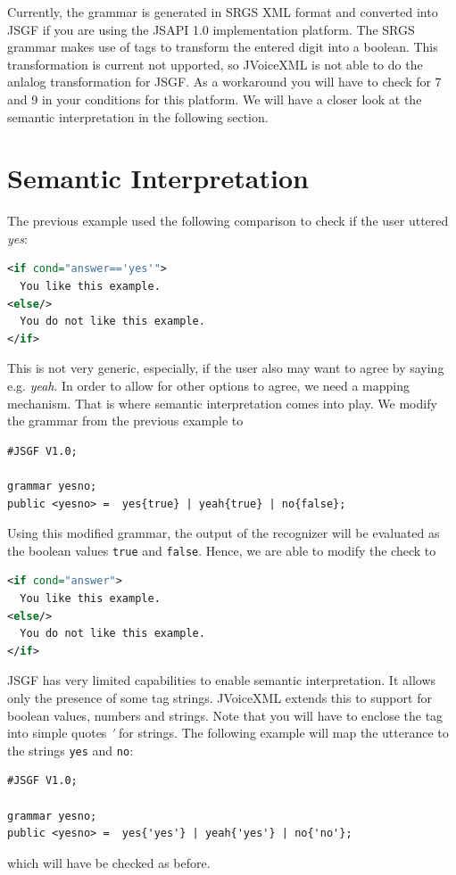 \documentclass[11pt,a4paper]{book}
\begin{document}
Currently, the grammar is generated in SRGS XML format and converted into JSGF
if you are using the JSAPI 1.0 implementation platform. The SRGS grammar
makes use of tags to transform the entered digit into a boolean. This
transformation is current not upported, so JVoiceXML is not able to do the
anlalog transformation for JSGF. As a workaround you will have to check for 7
and 9 in your conditions for this platform. We will have a closer look at the
semantic interpretation in the following section.

\section{Semantic Interpretation}
\label{sec:semantic-interpretation}

The previous example used the following comparison to check if the user uttered
\emph{yes}:

\begin{lstlisting}[language=XML]
<if cond="answer=='yes'">
  You like this example.
<else/>
  You do not like this example.
</if>
\end{lstlisting}

This is not very generic, especially, if the user also may want to agree by
saying e.g. \emph{yeah}. In order to allow for other options to agree, we need
a mapping mechanism. That is where semantic interpretation comes into play. We
modify the grammar from the previous example to

\begin{lstlisting}
#JSGF V1.0;

grammar yesno;
public <yesno> =  yes{true} | yeah{true} | no{false};
\end{lstlisting}

Using this modified grammar, the output of the recognizer will be evaluated
as the boolean values \lstinline{true} and \lstinline{false}. Hence, we are
able to modify the check to

\begin{lstlisting}[language=XML]
<if cond="answer">
  You like this example.
<else/>
  You do not like this example.
</if>
\end{lstlisting}

JSGF has very limited capabilities to enable semantic interpretation.
It allows only the presence of some tag strings. JVoiceXML extends this to
support for boolean values, numbers and strings. Note that you will have to enclose the tag into simple quotes \emph{\'} for strings.
The following example will map the utterance to the strings \lstinline{yes}
and \lstinline{no}:
\begin{lstlisting}
#JSGF V1.0;

grammar yesno;
public <yesno> =  yes{'yes'} | yeah{'yes'} | no{'no'};
\end{lstlisting}
which will have be checked as before.
\end{document}
